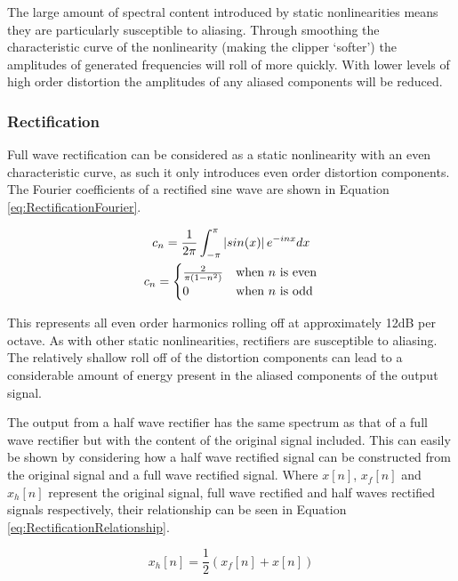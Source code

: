 			The large amount of spectral content introduced by static nonlinearities means they are
			particularly susceptible to aliasing. Through smoothing the characteristic curve of the
			nonlinearity (making the clipper `softer') the amplitudes of generated frequencies will roll of
			more quickly. With lower levels of high order distortion the amplitudes of any aliased components
			will be reduced.

		\subsubsection*{Rectification}
			Full wave rectification can be considered as a static nonlinearity with an even characteristic
			curve, as such it only introduces even order distortion components. The Fourier coefficients of a
			rectified sine wave are shown in Equation \ref{eq:RectificationFourier}.


			\begin{gather}
				c_{n} = \frac{1}{2\pi} \int_{-\pi}^{\pi} \left|sin(x)\right|e^{-inx} dx \nonumber \\
				c_{n} = \begin{cases}
					\frac{2}{\pi(1 - n^{2})} & \text{when $n$ is even} \\
					0 & \text{when $n$ is odd}
				\end{cases}
				\label{eq:RectificationFourier}
			\end{gather}

			This represents all even order harmonics rolling off at approximately 12dB per octave. As with
			other static nonlinearities, rectifiers are susceptible to aliasing. The relatively shallow roll
			off of the distortion components can lead to a considerable amount of energy present in the aliased
			components of the output signal. 

			The output from a half wave rectifier has the same spectrum as that of a full wave rectifier but
			with the content of the original signal included. This can easily be shown by considering how a half
			wave rectified signal can be constructed from the original signal and a full wave rectified signal.
			Where $x[n]$, $x_{f}[n]$ and $x_{h}[n]$ represent the original signal, full wave rectified and half
			waves rectified signals respectively, their relationship can be seen in Equation
			\ref{eq:RectificationRelationship}.

			\begin{equation}
				x_{h}[n] = \frac{1}{2} \left( x_{f}[n] + x[n] \right)
				\label{eq:RectificationRelationship}
			\end{equation}

